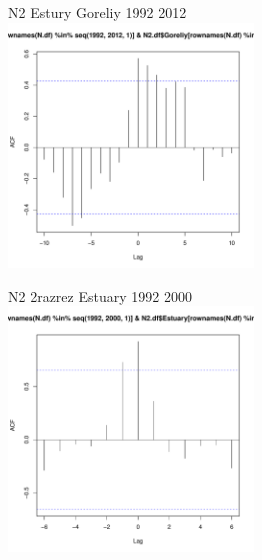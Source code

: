 \documentclass[12pt, a4paper]{disser}
\begin{document}
	\begin{figure}[ht]
	
	\begin{minipage}[b]{.46\linewidth}
	\begin{center}
	{\tiny  N2 Estury Goreliy 1992 2012}
		\includegraphics[width=65mm]{../White_Sea/dynamic_N_N1/crosscorr_N2_Estury_Goreliy_1992_2012.pdf}

	\end{center}
	\end{minipage}
	\hfil %
	\begin{minipage}[b]{.46\linewidth}
	\begin{center}
	{\tiny   N2 2razrez Estuary 1992 2000}
		\includegraphics[width=65mm]{../White_Sea/dynamic_N_N1/crosscorr_N2_2razrez_Estuary_1992_2000.pdf}
	\end{center}
	\end{minipage}




\end{figure}
\end{document}

